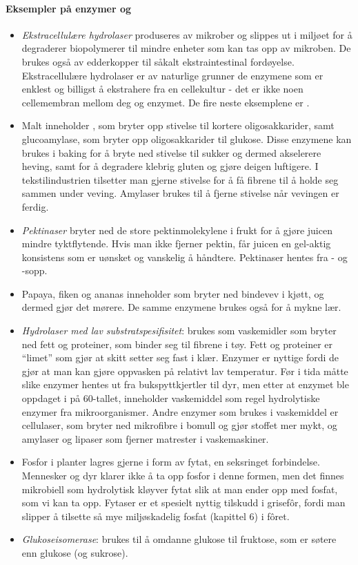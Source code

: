 \paragraph{Eksempler på enzymer og }
\begin{itemize}[noitemsep,nolistsep]
	\item \emph{Ekstracellulære hydrolaser} produseres av mikrober og slippes ut i miljøet for å degraderer biopolymerer til mindre enheter som kan tas opp av mikroben. De brukes også av edderkopper til såkalt ekstraintestinal fordøyelse. Ekstracellulære hydrolaser er av naturlige grunner de enzymene som er enklest og billigst å ekstrahere fra en cellekultur - det er ikke noen cellemembran mellom deg og enzymet. De fire neste eksemplene er .
	\item Malt inneholder , som bryter opp stivelse til kortere oligosakkarider, samt glucoamylase, som bryter opp oligosakkarider til glukose. Disse enzymene kan brukes i baking for å bryte ned stivelse til sukker og dermed akselerere heving, samt for å degradere klebrig gluten og gjøre deigen luftigere. I tekstilindustrien tilsetter man gjerne stivelse for å få fibrene til å holde seg sammen under veving. Amylaser brukes til å fjerne stivelse når vevingen er ferdig.
	\item \emph{Pektinaser} bryter ned de store pektinmolekylene i frukt for å gjøre juicen mindre tyktflytende. Hvis man ikke fjerner pektin, får juicen en gel-aktig konsistens som er uønsket og vanskelig å håndtere. Pektinaser hentes fra - og -sopp.
	\item Papaya, fiken og ananas inneholder  som bryter ned bindevev i kjøtt, og dermed gjør det mørere. De samme enzymene brukes også for å mykne lær. 
	\item \emph{Hydrolaser med lav substratspesifisitet}: brukes som vaskemidler som bryter ned fett og proteiner, som binder seg til fibrene i tøy. Fett og proteiner er ``limet'' som gjør at skitt setter seg fast i klær. Enzymer er nyttige fordi de gjør at man kan gjøre oppvasken på relativt lav temperatur. Før i tida måtte slike enzymer hentes ut fra bukspyttkjertler til dyr, men etter at enzymet  ble oppdaget i   på 60-tallet, inneholder vaskemiddel som regel hydrolytiske enzymer fra mikroorganismer. Andre enzymer som brukes i vaskemiddel er cellulaser, som bryter ned mikrofibre i bomull og gjør stoffet mer mykt, og amylaser og lipaser som fjerner matrester i vaskemaskiner.
	\item Fosfor i planter lagres gjerne i form av fytat, en seksringet forbindelse. Mennesker og dyr klarer ikke å ta opp fosfor i denne formen, men det finnes mikrobiell  som hydrolytisk kløyver fytat slik at man ender opp med fosfat, som vi kan ta opp. Fytaser er et spesielt nyttig tilskudd i grisefôr, fordi man slipper å tilsette så mye miljøskadelig fosfat (kapittel 6) i fôret.
	\item \emph{Glukoseisomerase}: brukes til å omdanne glukose til fruktose, som er søtere enn glukose (og sukrose). 
\end{itemize}

